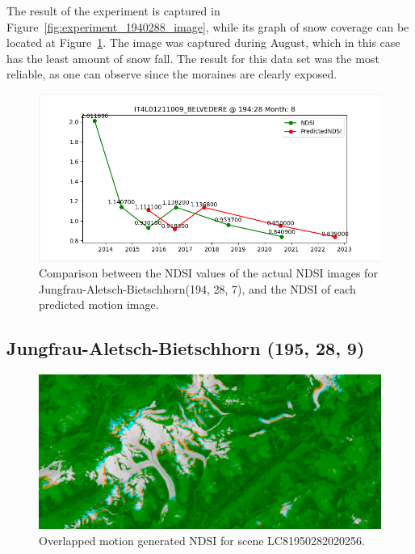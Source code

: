 \documentclass[12pt, a4paper]{report}
\begin{document}
	The result of the experiment is captured in Figure~\ref{fig:experiment_1940288_image}, while its graph of snow coverage can be located at Figure~\ref{fig:jungfrau_194288}. The image was captured during August, which in this case has the least amount of snow fall. The result for this data set was the most reliable, as one can observe since the moraines are clearly exposed. 
	
	\begin{figure}[h!]
		\centering
		\includegraphics[scale=0.5]{../images/experiment_194288.png}
		\caption{Comparison between the NDSI values of the actual NDSI images for Jungfrau-Aletsch-Bietschhorn(194, 28, 7), and the NDSI of each predicted motion image.}
		\label{fig:jungfrau_194288}
	\end{figure}
	
	
	\newpage{}
	
	\subsection{Jungfrau-Aletsch-Bietschhorn (195, 28, 9)}
	
	\begin{figure}[h!]
		\centering
		\includegraphics[width=\linewidth]{../images/experiment_1950289.png}
		\caption{Overlapped motion generated NDSI for scene LC81950282020256.}
		\label{fig:experiment_1950289_image}
	\end{figure}
\end{document}
